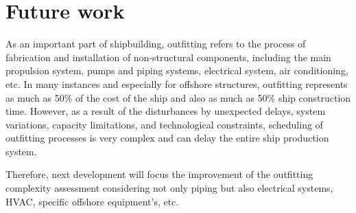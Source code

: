 \section{Future work}
As an important part of shipbuilding, outfitting refers to the process of fabrication and installation of non-structural components, including the main propulsion system, pumps and piping systems, electrical system, air conditioning, etc. In many instances and especially for offshore structures, outfitting represents as much as 50\% of the cost of the ship and also as much as 50\% ship construction time. However, as a result of the disturbances by unexpected delays, system variations, capacity limitations, and technological constraints, scheduling of outfitting processes is very complex and can delay the entire ship production system.


Therefore, next development will focus the improvement of the outfitting complexity assessment considering not only piping but also electrical systems, HVAC, specific offshore equipment's, etc.

